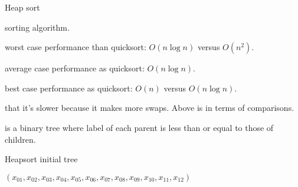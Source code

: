\begin{frame}{Heap sort}
  \begin{description}
    \setlength\itemsep{4mm}
    \item[Comparison] sorting algorithm.
    \item[Better] worst case performance than quicksort: \(O(n \log n)\) versus \(O(n^2)\).
    \item[Same] average case performance as quicksort: \(O(n \log n)\).
    \item[Better] best case performance as quicksort: \(O(n)\) versus \( O(n \log n) \).
    \item[Claims] that it's slower because it makes more swaps. Above is in terms of comparisons.
    \item[Heap] is a binary tree where label of each parent is less than or equal to those of children.
  \end{description}
\end{frame}

\begin{frame}[fragile]{Heapsort initial tree}
  \begin{center}
    $(x_{01},x_{02},x_{03},x_{04},x_{05},x_{06},x_{07},x_{08},x_{09},x_{10},x_{11},x_{12})$ \\[1cm]
  \end{center}
\end{frame}


